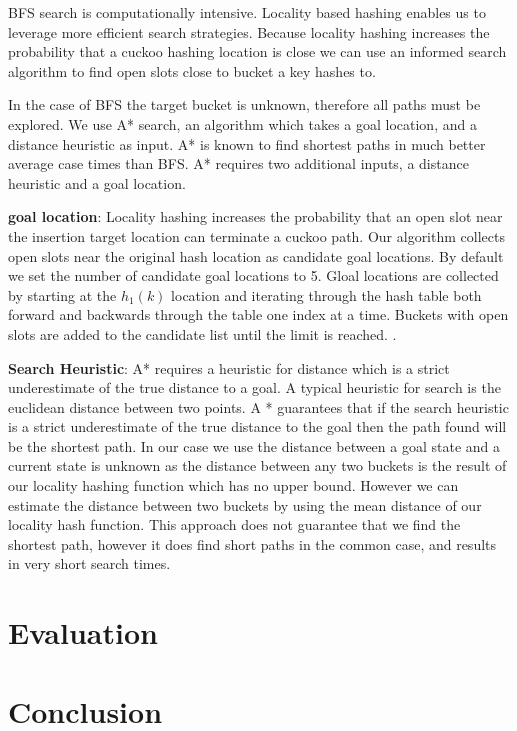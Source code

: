 BFS search is computationally intensive. Locality based
hashing enables us to leverage more efficient search
strategies. Because locality hashing increases the
probability that a cuckoo hashing location is close we can
use an informed search algorithm to find open slots close to
bucket a key hashes to. 

In the case of BFS the target bucket is unknown, therefore
all paths must be explored. We use A* search, an algorithm
which takes a goal location, and a distance heuristic as
input. A* is known to find shortest paths in much better
average case times than BFS. A* requires two additional
inputs, a distance heuristic and a goal location.

\textbf{goal location}: Locality hashing increases the
probability that an open slot near the insertion target
location can terminate a cuckoo path. Our algorithm collects
open slots near the original hash location as candidate goal
locations. By default we set the number of candidate goal
locations to 5. Gloal locations are collected by starting at
the $h_1(k)$ location and iterating through the hash
table both forward and backwards through the table one index
at a time. Buckets with open slots are added to the
candidate list until the limit is reached. .

\textbf{Search Heuristic}: A* requires a heuristic for
distance which is a strict underestimate of the true
distance to a goal. A typical heuristic for search is the
euclidean distance between two points. A * guarantees that
if the search heuristic is a strict underestimate of the
true distance to the goal then the path found will be the
shortest path. In our case we use the distance between a
goal state and a current state is unknown as the distance
between any two buckets is the result of our locality
hashing function which has no upper bound. However we can
estimate the distance between two buckets by using the mean
distance of our locality hash function. This approach does
not guarantee that we find the shortest path, however it
does find short paths in the common case, and results in
very short search times.


\section{Evaluation}
\label{sec:eval}

\section{Conclusion}
\label{sec:conclusion}
